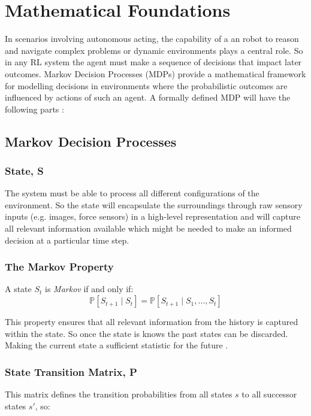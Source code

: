 \section{Mathematical Foundations}

  In scenarios involving autonomous acting, the capability of a an robot to reason and navigate complex problems or dynamic environments plays a central role. So in any RL system the agent must make a sequence of decisions that impact later outcomes. Markov Decision Processes (MDPs) provide a mathematical framework for modelling decisions in environments where the probabilistic outcomes are influenced by actions of such an agent. A formally defined MDP will have the following parts \cite{silver2015}:

\subsection{Markov Decision Processes}
  \subsubsection{State, S}
    The system must be able to process all different configurations of the environment. So the state will encapsulate the surroundings through raw sensory inputs (e.g. images, force sensors) in a high-level representation and will capture all relevant information available \cite{Sutton1998} which might be needed to make an informed decision at a particular time step.

  \subsubsection{The Markov Property}
    A state $S_t$ is \emph{Markov} if and only if:
    \[
      \mathbb{P} \left[S_{t+1} \mid S_t\right] = \mathbb{P}\left[ S_{t+1} \mid S_1, \ldots, S_t\right]
    \]

    This property ensures that all relevant information from the history is captured within the state. So once the state is knows the past states can be discarded. Making the current state a sufficient statistic for the future \cite{silver2015}.

  \subsubsection{State Transition Matrix, P}
    This matrix defines the transition probabilities from all states $s$ to all successor states $s'$, so:
    

